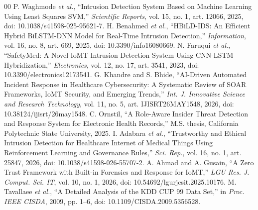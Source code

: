 \documentclass[conference]{IEEEtran}
\begin{document}
\begin{thebibliography}{00}
 P. Waghmode \emph{et al.}, ``Intrusion Detection System Based on Machine Learning Using Least Squares SVM,'' \emph{Scientific Reports}, vol. 15, no. 1, art. 12066, 2025, doi: 10.1038/s41598-025-95621-7.
 H. Benahmed \emph{et al.}, ``HBiLD-IDS: An Efficient Hybrid BiLSTM-DNN Model for Real-Time Intrusion Detection,'' \emph{Information}, vol. 16, no. 8, art. 669, 2025, doi: 10.3390/info16080669.
 N. Faruqui \emph{et al.}, ``SafetyMed: A Novel IoMT Intrusion Detection System Using CNN-LSTM Hybridization,'' \emph{Electronics}, vol. 12, no. 17, art. 3541, 2023, doi: 10.3390/electronics12173541.
 G. Khandre and S. Bhide, ``AI-Driven Automated Incident Response in Healthcare Cybersecurity: A Systematic Review of SOAR Frameworks, IoMT Security, and Emerging Trends,'' \emph{Int. J. Innovative Science and Research Technology}, vol. 11, no. 5, art. IJISRT26MAY1548, 2026, doi: 10.38124/ijisrt/26may1548.
 C. Ornstil, ``A Role-Aware Insider Threat Detection and Response System for Electronic Health Records,'' M.S. thesis, California Polytechnic State University, 2025.
 I. Adabara \emph{et al.}, ``Trustworthy and Ethical Intrusion Detection for Healthcare Internet of Medical Things Using Reinforcement Learning and Governance Rules,'' \emph{Sci. Rep.}, vol. 16, no. 1, art. 25847, 2026, doi: 10.1038/s41598-026-55707-2.
 A. Ahmad and A. Gusain, ``A Zero Trust Framework with Built-in Forensics and Response for IoMT,'' \emph{LGU Res. J. Comput. Sci. IT}, vol. 10, no. 1, 2026, doi: 10.54692/lgurjcsit.2025.10176.
 M. Tavallaee \emph{et al.}, ``A Detailed Analysis of the KDD CUP 99 Data Set,'' in \emph{Proc. IEEE CISDA}, 2009, pp. 1--6, doi: 10.1109/CISDA.2009.5356528.
\end{thebibliography}
\end{document}
